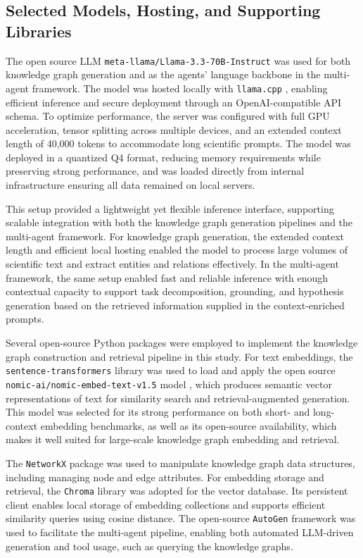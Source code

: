 \subsection{Selected Models, Hosting, and Supporting Libraries}

The open source LLM \texttt{meta-llama/Llama-3.3-70B-Instruct} \cite{llama3modelcard} was used for both knowledge graph generation and as the agents' language backbone in the multi-agent framework. The model was hosted locally with \texttt{llama.cpp} \cite{gerganov2023llamacpp}, enabling efficient inference and secure deployment through an OpenAI-compatible API schema. To optimize performance, the server was configured with full GPU acceleration, tensor splitting across multiple devices, and an extended context length of 40,000 tokens to accommodate long scientific prompts. The model was deployed in a quantized Q4 format, reducing memory requirements while preserving strong performance, and was loaded directly from internal infrastructure ensuring all data remained on local servers.

This setup provided a lightweight yet flexible inference interface, supporting scalable integration with both the knowledge graph generation pipelines and the multi-agent framework. For knowledge graph generation, the extended context length and efficient local hosting enabled the model to process large volumes of scientific text and extract entities and relations effectively. In the multi-agent framework, the same setup enabled fast and reliable inference with enough contextual capacity to support task decomposition, grounding, and hypothesis generation based on the retrieved information supplied in the context-enriched prompts.

Several open-source Python packages were employed to implement the knowledge graph construction and retrieval pipeline in this study. For text embeddings, the \texttt{sentence-transformers} library \cite{reimers-2019-sentence-bert} was used to load and apply the open source \texttt{nomic-ai/nomic-embed-text-v1.5} model \cite{nussbaum2024nomic}, which produces semantic vector representations of text for similarity search and retrieval-augmented generation. This model was selected for its strong performance on both short- and long-context embedding benchmarks, as well as its open-source availability, which makes it well suited for large-scale knowledge graph embedding and retrieval.

The \texttt{NetworkX} package \cite{SciPyProceedings_11} was used to manipulate knowledge graph data structures, including managing node and edge attributes. For embedding storage and retrieval, the \texttt{Chroma} library \cite{chroma} was adopted for the vector database. Its persistent client enables local storage of embedding collections and supports efficient similarity queries using cosine distance. The open-source \texttt{AutoGen} framework \cite{wu2023autogenenablingnextgenllm} was used to facilitate the multi-agent pipeline, enabling both automated LLM-driven generation and tool usage, such as querying the knowledge graphs.

